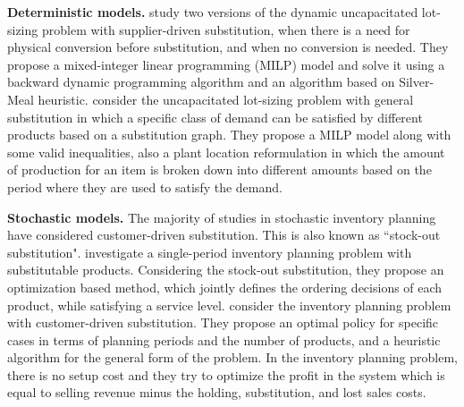\documentclass[msom]{oo}
\begin{document}
\textbf{Deterministic models.}
\cite{hsu2005dynamic} study two versions of the dynamic uncapacitated lot-sizing problem with supplier-driven substitution, when there is a need for physical conversion before substitution, and when no conversion is needed. They propose a mixed-integer linear programming (MILP) model and solve it using a backward dynamic programming algorithm and an algorithm based on Silver-Meal heuristic. \cite{lang2010efficient} consider the uncapacitated lot-sizing problem with general substitution in which a specific class of demand can be satisfied by different products based on a substitution graph. They propose a MILP model along with some valid inequalities, also a plant location reformulation in which the amount of production for an item is broken down into different amounts based on the period where they are used to satisfy the demand. %

\textbf{Stochastic models.}
The majority of studies in stochastic inventory planning have considered customer-driven substitution. %
This is also known as ``stock-out substitution". \cite{akccaycategory} investigate a single-period inventory planning problem with substitutable products. Considering the stock-out substitution, they propose an optimization based method, which jointly defines the ordering decisions of each product, while satisfying a service level. 
\cite{nagarajan2008inventory} consider the inventory planning problem with customer-driven substitution. They propose an optimal policy for specific cases in terms of planning periods and the number of products, and a heuristic algorithm for the general form of the problem. In the inventory planning problem, there is no setup cost and they try to optimize the profit in the system which is equal to selling revenue minus the holding, substitution, and lost sales costs.
\end{document}

